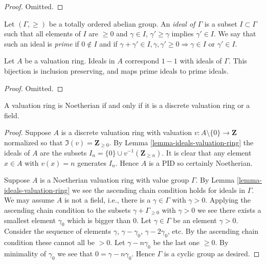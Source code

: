 \begin{proof}
Omitted.
\end{proof}

\noindent
Let $(\Gamma, \geq)$ be a totally ordered abelian group.
An {\it ideal of $\Gamma$} is a subset $I \subset \Gamma$ such
that all elements of $I$ are $\geq 0$ and $\gamma \in I$,
$\gamma' \geq \gamma$ implies $\gamma' \in I$. We say that such
an ideal is {\it prime} if $0 \not \in I$ and if
$\gamma + \gamma' \in I, \gamma, \gamma' \geq 0
\Rightarrow \gamma \in I \text{ or } \gamma' \in I$.

\begin{lemma}
\label{lemma-ideals-valuation-ring}
Let $A$ be a valuation ring.
Ideals in $A$ correspond $1 - 1$ with ideals of $\Gamma$.
This bijection is inclusion preserving, and maps prime
ideals to prime ideals.
\end{lemma}

\begin{proof}
Omitted.
\end{proof}

\begin{lemma}
\label{lemma-valuation-ring-Noetherian-discrete}
A valuation ring is Noetherian if and only if it is
a discrete valuation ring or a field.
\end{lemma}

\begin{proof}
Suppose $A$ is a discrete valuation ring
with valuation $v : A \setminus \{0\} \to \mathbf{Z}$
normalized so that $\Im(v) = \mathbf{Z}_{\geq 0}$.
By Lemma \ref{lemma-ideals-valuation-ring} the ideals of $A$ are the subsets
$I_n = \{0\} \cup v^{-1}(\mathbf{Z}_{\geq n})$. It is clear
that any element $x \in A$ with $v(x) = n$ generates $I_n$.
Hence $A$ is a PID so certainly Noetherian.

\medskip\noindent
Suppose $A$ is a Noetherian valuation ring with value group $\Gamma$.
By Lemma \ref{lemma-ideals-valuation-ring} we see the ascending chain
condition holds for ideals in $\Gamma$.
We may assume $A$ is not a field, i.e., there is a $\gamma \in \Gamma$
with $\gamma > 0$. Applying the ascending chain condition to the subsets
$\gamma + \Gamma_{\geq 0}$ with $\gamma > 0$ we see
there exists a smallest element $\gamma_0$ which is bigger than $0$.
Let $\gamma \in \Gamma$ be an element $\gamma > 0$. Consider the sequence
of elements $\gamma$, $\gamma - \gamma_0$, $\gamma - 2\gamma_0$,
etc. By the ascending chain condition these cannot all be $> 0$.
Let $\gamma - n \gamma_0$ be the last one $\geq 0$. By minimality
of $\gamma_0$ we see that $0 = \gamma - n \gamma_0$. Hence $\Gamma$
is a cyclic group as desired.
\end{proof}























